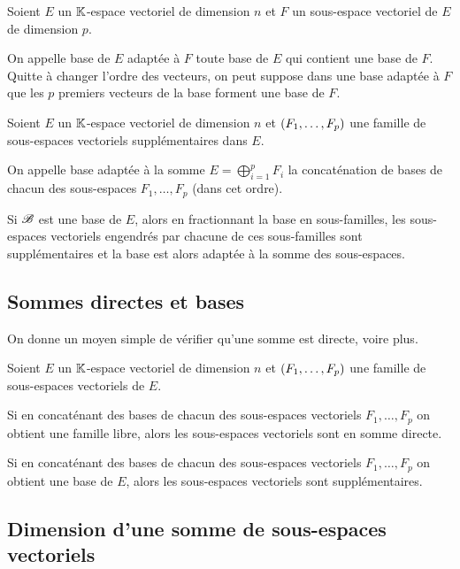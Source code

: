 \begin{defi}
Soient \(E\) un \(\mathbb{K}\)-espace vectoriel de dimension \(n\) et \(F\) un sous-espace vectoriel de \(E\) de dimension \(p\).

On appelle base de \(E\) adaptée à \(F\) toute base de \(E\) qui contient une base de \(F\). Quitte à changer l'ordre des vecteurs, on peut suppose dans une base adaptée à \(F\) que les \(p\) premiers vecteurs de la base forment une base de \(F\).
\end{defi}

\begin{defi}
Soient \(E\) un \(\mathbb{K}\)-espace vectoriel de dimension \(n\) et \(\left(F_1,\dots,F_p\right)\) une famille de sous-espaces vectoriels supplémentaires dans \(E\).

On appelle base adaptée à la somme \(E=\bigoplus_{i=1}^pF_i\) la concaténation de bases de chacun des sous-espaces \(F_1,\dots,F_p\) (dans cet ordre).
\end{defi}

Si \(\mathscr{B}\) est une base de \(E\), alors en fractionnant la base en sous-familles, les sous-espaces vectoriels engendrés par chacune de ces sous-familles sont supplémentaires et la base est alors adaptée à la somme des sous-espaces.

\subsection{Sommes directes et bases}

On donne un moyen simple de vérifier qu'une somme est directe, voire plus.

\begin{prop}
Soient \(E\) un \(\mathbb{K}\)-espace vectoriel de dimension \(n\) et \(\left(F_1,\dots,F_p\right)\) une famille de sous-espaces vectoriels de \(E\).

Si en concaténant des bases de chacun des sous-espaces vectoriels \(F_1,\dots,F_p\) on obtient une famille libre, alors les sous-espaces vectoriels sont en somme directe.

Si en concaténant des bases de chacun des sous-espaces vectoriels \(F_1,\dots,F_p\) on obtient une base de \(E\), alors les sous-espaces vectoriels sont supplémentaires.
\end{prop}

\subsection{Dimension d'une somme de sous-espaces vectoriels}

